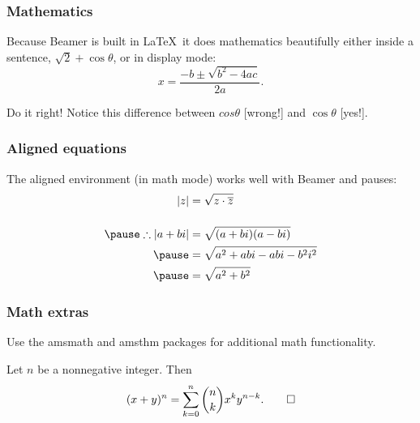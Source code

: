 \documentclass[t,14pt,aspectratio=169]{beamer}
\begin{document}
\begin{frame}
  \frametitle{Mathematics}
  \large
  Because Beamer is built in \LaTeX\ it does mathematics beautifully
  either inside a sentence, $\sqrt2 + \cos\theta$, or in display mode:
  \[
  x = \frac{-b \pm \sqrt{b^2-4ac}}{2a} .
  \]

  Do it right! Notice this difference between $cos\theta$ [wrong!] and
  $\cos\theta$ [yes!]. 
\end{frame}

\begin{frame}
  \frametitle{Aligned equations}
  \large The \alert{aligned} environment (in math mode) works well
  with Beamer and pauses:
  \[
  \begin{aligned}
    |z| &= \sqrt{z \cdot \overline{z}} \\[12pt]
    \pause
    \therefore |a+bi| &= \sqrt{(a+bi)(a-bi)} \\ \pause
    &= \sqrt{a^2 +abi -abi - b^2i^2} \\ \pause
    &= \sqrt{a^2 + b^2}
  \end{aligned}
  \]
\end{frame}


\begin{frame}
  \frametitle{Math extras}
  \large
  Use the \alert{amsmath} and \alert{amsthm} packages for additional
  math functionality.

  \begin{theorem}[Binomial]
    Let $n$ be a nonnegative integer. Then
    \[
    (x+y)^n = \sum_{k=0}^n \binom{n}{k} x^k y^{n-k}. \qed
    \]
  \end{theorem}
\end{frame}
\end{document}
